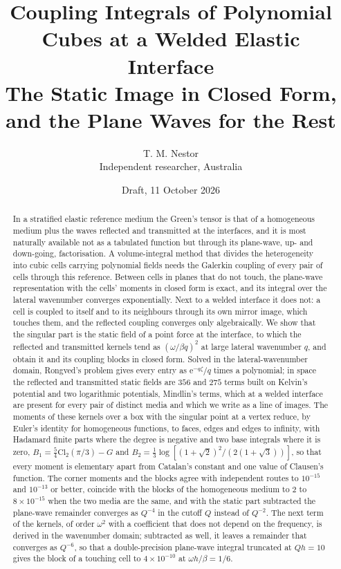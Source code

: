 \documentclass[11pt,a4paper]{article}
\title{\bfseries Coupling Integrals of Polynomial Cubes at a Welded Elastic Interface\\[4pt]
\large The Static Image in Closed Form, and the Plane Waves for the Rest}
\author{T. M. Nestor\\[2pt]\small Independent researcher, Australia}
\date{Draft, 11 October 2026}
\newcommand{\ee}{\mathrm{e}}
\begin{document}
\maketitle

\begin{abstract}
\noindent
In a stratified elastic reference medium the Green's tensor is that of a homogeneous medium plus the waves
reflected and transmitted at the interfaces, and it is most naturally available not as a tabulated function
but through its plane-wave, up- and down-going, factorisation. A volume-integral method that divides the
heterogeneity into cubic cells carrying polynomial fields needs the Galerkin coupling of every pair of
cells through this reference. Between cells in planes that do not touch, the plane-wave representation
with the cells' moments in closed form is exact, and its integral over the lateral wavenumber converges
exponentially. Next to a welded interface it does not: a cell is coupled to itself and to its neighbours
through its own mirror image, which touches them, and the reflected coupling converges only algebraically.
We show that the singular part is the static field of a point force at the interface, to which the
reflected and transmitted kernels tend as $(\omega/\beta q)^2$ at large lateral wavenumber $q$, and obtain it and
its coupling blocks in closed form. Solved in the lateral-wavenumber domain, Rongved's problem gives every
entry as $\ee^{-q\zeta}/q$ times a polynomial; in space the reflected and transmitted static fields are $356$
and $275$ terms built on Kelvin's potential and two logarithmic potentials, Mindlin's terms, which at a
welded interface are present for every pair of distinct media and which we write as a line of images. The
moments of these kernels over a box with the singular point at a vertex reduce, by Euler's identity for
homogeneous functions, to faces, edges and edges to infinity, with Hadamard finite parts where the degree is
negative and two base integrals where it is zero,
$B_1=\tfrac54\mathrm{Cl}_2(\pi/3)-G$ and $B_2=\tfrac13\log[(1+\sqrt2)^2/(2(1+\sqrt3))]$, so that every moment
is elementary apart from Catalan's constant and one value of Clausen's function. The corner moments and
the blocks agree with independent routes to $10^{-15}$ and $10^{-13}$ or better, coincide with the blocks of the homogeneous medium
to $2$ to $8\times10^{-15}$ when the two media are the same, and with the static part subtracted the
plane-wave remainder converges as $Q^{-4}$ in the cutoff $Q$ instead of $Q^{-2}$. The next term of the
kernels, of order $\omega^2$ with a coefficient that does not depend on the frequency, is derived in the
wavenumber domain; subtracted as well, it leaves a remainder that converges as $Q^{-6}$, so that a
double-precision plane-wave integral truncated at $Qh=10$ gives the block of a touching cell to
$4\times10^{-10}$ at $\omega h/\beta=1/6$.
\end{abstract}
\end{document}
